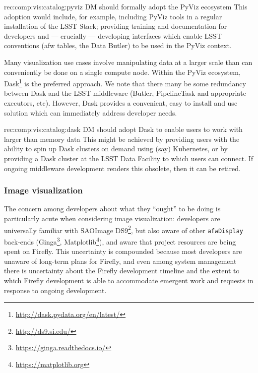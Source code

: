 \begin{recommendation}
  {rec:comp:vis:catalog:pyviz}
  {DM should formally adopt the PyViz ecosystem}
This adoption would include, for example, including PyViz tools in a regular installation of the LSST Stack; providing training and documentation for developers and --- crucially --- developing interfaces which enable LSST conventions (afw tables, the Data Butler) to be used in the PyViz context.
\end{recommendation}

Many visualization use cases involve manipulating data at a larger scale than can conveniently be done on a single compute node.
Within the PyViz ecosystem, Dask\footnote{\url{http://dask.pydata.org/en/latest/}} is the preferred approach.
We note that there many be some redundancy between Dask and the LSST middleware (Butler, PipelineTask and appropriate executors, etc).
However, Dask provides a convenient, easy to install and use solution which can immediately address developer needs.

\begin{recommendation}
  {rec:comp:vis:catalog:dask}
  {DM should adopt Dask to enable users to work with larger than memory data}
This might be achieved by providing users with the ability to spin up Dask clusters on demand using (say) Kubernetes, or by providing a Dask cluster at the LSST Data Facility to which users can connect.
If ongoing middleware development renders this obsolete, then it can be retired.
\end{recommendation}

\subsubsection{Image visualization}
\label{sec:comp:vis:image}

The concern among developers about what they ``ought'' to be doing is particularly acute when considering image visualization: developers are universally familiar with SAOImage DS9\footnote{\url{http://ds9.si.edu/}}, but also aware of other \texttt{afwDisplay} back-ends (Ginga\footnote{\url{https://ginga.readthedocs.io/}}, Matplotlib\footnote{\url{https://matplotlib.org}}), and aware that project resources are being spent on Firefly.
This uncertainty is compounded because most developers are unaware of long-term plans for Firefly, and even among system management there is uncertainty about the Firefly development timeline and the extent to which Firefly development is able to accommodate emergent work and requests in response to ongoing development.

